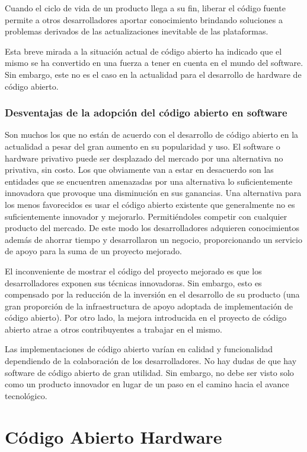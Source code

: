 Cuando el ciclo de vida de un producto llega a su fin, liberar el
código fuente permite a otros desarrolladores aportar conocimiento
brindando soluciones a problemas derivados de las actualizaciones
inevitable de las plataformas.

Esta breve mirada a la situación actual de código abierto ha indicado
que el mismo se ha convertido en una fuerza a tener en cuenta en el
mundo del software. Sin embargo, este no es el caso en la actualidad
para el desarrollo de hardware de código abierto.

\subsubsection{Desventajas de la adopción del código abierto en software}

Son muchos los que no están de acuerdo con el desarrollo de código
abierto en la actualidad a pesar del gran aumento en su popularidad y
uso. El software o hardware privativo puede ser desplazado del mercado
por una alternativa no privativa, sin costo. Los que obviamente van a
estar en desacuerdo son las entidades que se encuentren amenazadas por
una alternativa lo suficientemente innovadora que provoque una
disminución en sus ganancias. Una alternativa para los menos
favorecidos es usar el código abierto existente que generalmente no es
suficientemente innovador y mejorarlo. Permitiéndoles competir con
cualquier producto del mercado. De este modo los desarrolladores
adquieren conocimientos además de ahorrar tiempo y desarrollaron un
negocio, proporcionando un servicio de apoyo para la suma de un
proyecto mejorado.

El inconveniente de mostrar el código del proyecto mejorado es que los
desarrolladores exponen sus técnicas innovadoras. Sin embargo, esto es
compensado por la reducción de la inversión en el desarrollo de su
producto (una gran proporción de la infraestructura de apoyo adoptada
de implementación de código abierto). Por otro lado, la mejora
introducida en el proyecto de código abierto atrae a otros
contribuyentes a trabajar en el mismo.

Las implementaciones de código abierto varían en calidad y
funcionalidad dependiendo de la colaboración de los
desarrolladores. No hay dudas de que hay software de código abierto de
gran utilidad. Sin embargo, no debe ser visto solo como un producto
innovador en lugar de un paso en el camino hacia el avance
tecnológico.

\section{Código Abierto Hardware}

